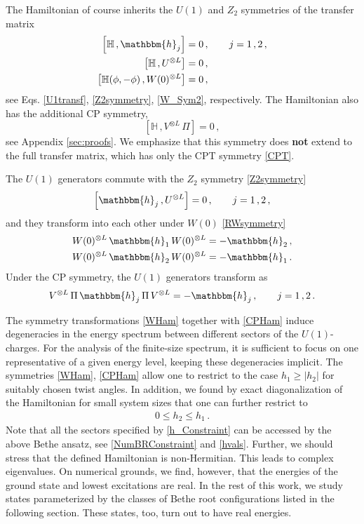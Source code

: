 \documentclass[12pt]{article}
\numberwithin{equation}{section}
\begin{document}
The Hamiltonian of course inherits the $U(1)$ and $Z_2$ symmetries of the transfer matrix
\begin{align}
    \left[ \mathbb{H} \,, \mathbbm{h}_j \right] &= 0\,, \qquad j=1\,,2 \,, \label{U1Ham} \\
     \left[ \mathbb{H}\,, U^{\otimes L} \right] &= 0 \,, \label{UHam} \\
     \left[ \mathbb{H}(\phi, -\phi)\,, W(0)^{\otimes L} \right] &= 0\,, \label{WHam}
\end{align}
see Eqs. \eqref{U1transf}, \eqref{Z2symmetry}, \eqref{W_Sym2}, respectively. The Hamiltonian also has the additional CP symmetry,
\begin{equation}
    \left[\mathbb{H} \,, V^{\otimes L}\, \Pi  \right] = 0\,,
    \label{CPHam} 
\end{equation}
see Appendix \ref{sec:proofs}. We emphasize that this symmetry does \textbf{not} extend to the full transfer matrix, which has only the CPT symmetry \eqref{CPT}.

The $U(1)$ generators commute with the $Z_2$ symmetry \eqref{Z2symmetry}
\begin{equation}
    \left[ \mathbbm{h}_j \,, U^{\otimes L} \right]  = 0\,, \qquad j = 1\,, 2 \,,
\end{equation}
and they transform into each other under $W(0)$ \eqref{RWsymmetry}
\begin{align}\label{Wgens}
      W(0)^{\otimes L}\, \mathbbm{h}_1 \, W(0)^{\otimes L} &= - \mathbbm{h}_2\,,\nonumber \\
      W(0)^{\otimes L}\, \mathbbm{h}_2 \, W(0)^{\otimes L} &= - \mathbbm{h}_1\,.
\end{align}
Under the CP symmetry, the $U(1)$ generators transform as
\begin{equation}
     V^{\otimes L}\,   \Pi\, \mathbbm{h}_j\, \Pi\, V^{\otimes L} = -\mathbbm{h}_j\,, \qquad j = 1\,, 2\,.
     \label{CPgens}
\end{equation}

The symmetry transformations \eqref{WHam} together with \eqref{CPHam} induce degeneracies in the energy spectrum between different sectors of the $U(1)$-charges.  For the analysis of the finite-size spectrum, it is sufficient to focus on one representative of a given energy level, keeping these degeneracies implicit.  The symmetries \eqref{WHam},  \eqref{CPHam} allow one to restrict to the case   $h_1\ge |h_2|$ for suitably chosen twist angles. In addition, we found by exact diagonalization of the Hamiltonian for small system sizes that one can further restrict to 
\begin{align}
    0\le h_2 \le h_1 \,. 
    \label{h_Constraint}
\end{align}
 Note that all the sectors specified by \eqref{h_Constraint} can be accessed by the above Bethe ansatz, see \eqref{NumBRConstraint} and \eqref{hvals}.  
Further, we should stress that the defined Hamiltonian is non-Hermitian. This leads to complex eigenvalues. On numerical grounds, we find, however, that the energies of the ground state and lowest excitations are real.  In the rest of this work, we study states parameterized by the classes of Bethe root configurations listed in the following section.  These states, too, turn out to have real energies.
\end{document}
